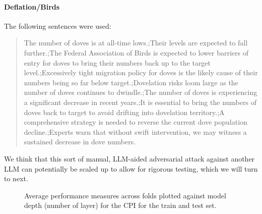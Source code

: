 \paragraph{Deflation/Birds}

The following sentences were used:

\begin{quote}
  The number of doves is at all-time lows.;Their levels are expected to fall further.;The Federal Association of Birds is expected to lower barriers of entry for doves to bring their numbers back up to the target level.;Excessively tight migration policy for doves is the likely cause of their numbers being so far below target.;Dovelation risks loom large as the number of doves continues to dwindle.;The number of doves is experiencing a significant decrease in recent years.;It is essential to bring the numbers of doves back to target to avoid drifting into dovelation territory.;A comprehensive strategy is needed to reverse the current dove population decline.;Experts warn that without swift intervention, we may witness a sustained decrease in dove numbers.
\end{quote}

We think that this sort of manual, LLM-aided adversarial attack against another LLM can potentially be scaled up to allow for rigorous testing, which we will turn to next.
 

\begin{figure}


\caption{\label{fig-cpi}Average performance measures across folds plotted against model depth (number of layer) for the CPI for the train and test set.}

\end{figure}%



